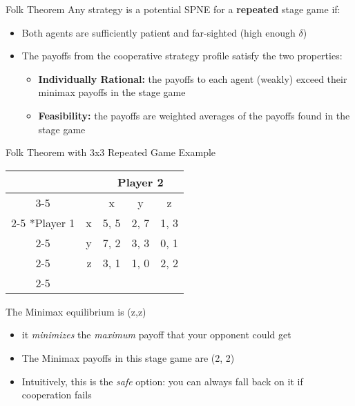 \begin{frame}{Folk Theorem}
  Any strategy is a potential SPNE for a \textbf{repeated} stage game if: 
  \begin{itemize}
    \item Both agents are sufficiently patient and far-sighted (high enough $\delta$)
    \item The payoffs from the cooperative strategy profile satisfy the two properties: 
    \begin{itemize}
      \item \textbf{Individually Rational:} the payoffs to each agent (weakly) exceed their minimax payoffs in the stage game 
      \item \textbf{Feasibility:} the payoffs are weighted averages of the payoffs found in the stage game
    \end{itemize}
  \end{itemize}
\end{frame}

\begin{frame}{Folk Theorem with 3x3 Repeated Game Example}
  \begin{center}
  \begin{tabular}{cr|c|c|c|}
  	& \multicolumn{1}{c}{} & \multicolumn{3}{c}{Player 2}\\ \cline{3-5}
    \multicolumn{1}{c}{} & \multicolumn{1}{c}{} & x & y & z \\\cline{2-5}
    \multirow{3}*{Player 1}  & x & 5, 5 & 2, 7 & 1, 3 \\\cline{2-5}
                             & y & 7, 2 & 3, 3 & 0, 1 \\\cline{2-5}
                             & z & 3, 1 & 1, 0 & 2, 2 \\\cline{2-5}
  \end{tabular}
  \end{center}

  The \alert{Minimax} equilibrium is (z,z)
  \begin{itemize}
    \item it \textit{minimizes} the \textit{maximum} payoff that your opponent could get
    \item The Minimax payoffs in this stage game are (2, 2)
    \item Intuitively, this is the \textit{safe} option: you can always fall back on it if cooperation fails
  \end{itemize}
\end{frame}

